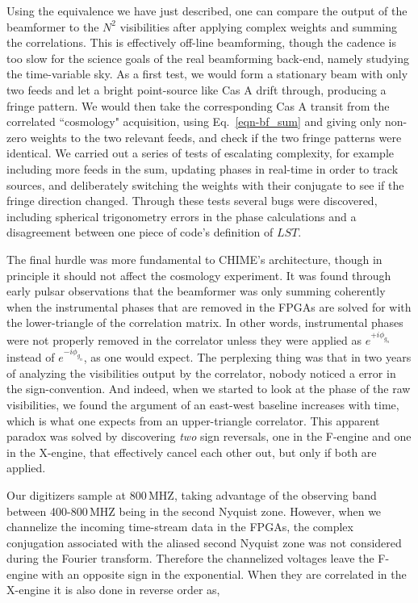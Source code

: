 Using the equivalence we have just described, one can compare the 
output of the beamformer to 
the $N^2$ visibilities after applying complex 
weights and summing the correlations. This is effectively 
off-line beamforming, though the cadence is too slow for 
the science goals of the real beamforming 
back-end, namely studying the time-variable sky. 
As a first test, 
we would form a stationary beam with only two feeds and let a 
bright point-source like Cas A drift through, 
producing a fringe pattern. We would then take 
the corresponding Cas A transit from the correlated ``cosmology" 
acquisition, using Eq.~\ref{eqn-bf_sum} and giving only non-zero 
weights to the two relevant feeds, and check if the two
fringe patterns were identical. We carried out a series 
of tests of escalating complexity, for example including more feeds in the sum, updating 
phases in real-time in order to track sources, and deliberately 
switching the weights with their conjugate to see if the fringe 
direction changed. Through these tests several bugs were discovered, 
including spherical trigonometry errors in the phase 
calculations and a disagreement between one piece of code's 
definition of $LST$. 

The final hurdle was more fundamental to CHIME's architecture,
though in principle it should not affect the cosmology experiment. 
It was found through 
early pulsar observations that the beamformer was only summing
coherently when the instrumental phases that are removed in 
the FPGAs are solved for with the lower-triangle of the correlation 
matrix. In other words, instrumental phases were not properly 
removed in the correlator unless they were applied as 
$e^{+i\phi_{g_n}}$ instead of $e^{-i\phi_{g_n}}$, as one would expect.
The perplexing thing was that in two years of analyzing 
the visibilities output by the correlator, nobody noticed a 
error in the sign-convention. And indeed, when we started to look
at the phase of the raw visibilities, we found the argument 
of an east-west baseline increases with time, which is 
what one expects from an upper-triangle correlator. This 
apparent paradox was solved by discovering \textit{two} sign 
reversals, one in the F-engine and one in the X-engine, that
effectively cancel each other out, but only if both are applied. 

Our digitizers sample at 800\,MHZ, taking advantage of the observing 
band between 400-800\,MHZ being in the second Nyquist zone.
However, when we channelize
the incoming time-stream data in the FPGAs, the complex conjugation 
associated with the aliased second Nyquist zone was not considered during the 
Fourier transform. Therefore the channelized voltages leave the F-engine 
with an opposite sign in the exponential. When they are correlated
in the X-engine it is also done in reverse order as, 

